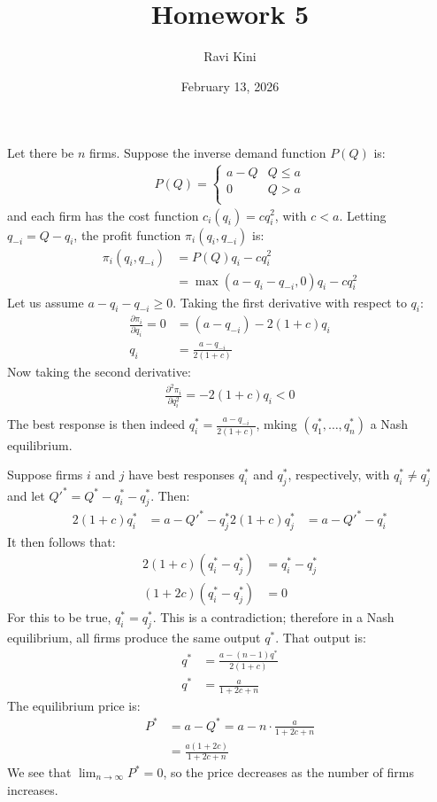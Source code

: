 \documentclass{article}
\title{Homework 5}
\author{Ravi Kini}
\date{February 13, 2026}
\begin{document}
\maketitle

\problem{}
Let there be $n$ firms. Suppose the inverse demand function $P(Q)$ is:
\begin{align*}
    P(Q) = \begin{cases}
        a - Q & Q \leq a \\
        0 & Q > a \\
    \end{cases}
\end{align*}
and each firm has the cost function $c_i(q_i) = cq_i^2$, with $c < a$. Letting $q_{-i} = Q - q_i$, the profit function $\pi_i(q_i, q_{-i})$ is:
\begin{align*}
    \pi_i(q_i, q_{-i}) & = P(Q)q_i - cq_i^2 \\
    & = \max(a - q_i - q_{-i}, 0)q_i - cq_i^2
\end{align*}
Let us assume $a - q_i - q_{-i} \geq 0$. Taking the first derivative with respect to $q_i$:
\begin{align*}
    \frac{\partial \pi_i}{\partial q_i} = 0 & = (a - q_{-i}) - 2(1 + c)q_i \\
    q_i & = \frac{a - q_{-i}}{2(1 + c)}
\end{align*}
Now taking the second derivative:
\begin{align*}
    \frac{\partial^2 \pi_i}{\partial q_i^2} = - 2(1 + c)q_i < 0 \\
\end{align*}
The best response is then indeed $q_i^* = \frac{a - q_{-i}}{2(1 + c)}$, mking $(q_1^*, \ldots, q_n^*)$ a Nash equilibrium.

Suppose firms $i$ and $j$ have best responses $q_i^*$ and $q_j^*$, respectively, with $q_i^* \neq q_j^*$ and let ${Q'}^* = Q^* - q_i^* - q_j^*$. Then:
\begin{align*}
    2(1 + c)q_i^* & = a - {Q'}^* - q_j^*
    2(1 + c)q_j^* & = a - {Q'}^* - q_i^*
\end{align*}
It then follows that:
\begin{align*}
    2(1 + c)(q_i^* - q_j^*) & = q_i^* - q_j^* \\
    (1 + 2c)(q_i^* - q_j^*) & = 0
\end{align*}
For this to be true, $q_i^* = q_j^*$. This is a contradiction; therefore in a Nash equilibrium, all firms produce the same output $q^*$. That output is:
\begin{align*}
    q^* & = \frac{a - (n - 1)q^*}{2(1 + c)} \\
    q^* & = \frac{a}{1 + 2c + n}
\end{align*}
The equilibrium price is:
\begin{align*}
    P^* & = a - Q^* = a - n \cdot \frac{a}{1 + 2c + n} \\
    & = \frac{a(1 + 2c)}{1 + 2c + n}
\end{align*}
We see that $\lim_{n\to\infty} P^* = 0$, so the price decreases as the number of firms increases.
\end{document}
